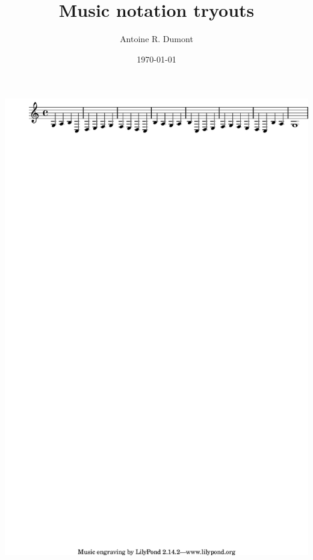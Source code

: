 \documentclass[11pt]{article}
\author{Antoine R. Dumont}
\date{\today}
\title{Music notation tryouts}
\begin{document}
\maketitle
\tableofcontents

\includegraphics[width=.9\linewidth]{Mixolydian.png}
\end{document}
